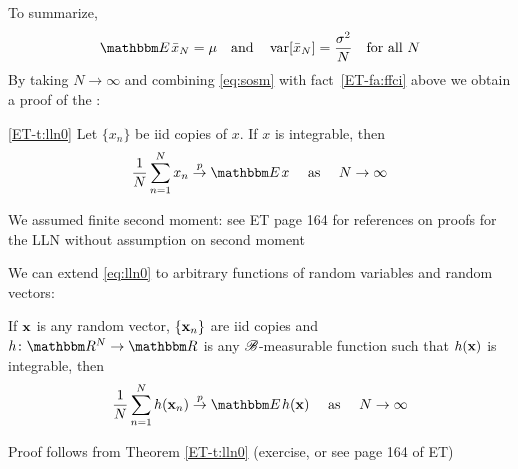 \begin{frame}

    \vspace{2em}
    To summarize,
    \begin{equation}
        \label{eq:sosm}
        \EE \bar x_N = \mu 
        \quad \text{and} \quad
        \var[ \bar x_N ] = \frac{\sigma^2}{N}
        \quad \text{for all } N
    \end{equation}
    By taking $N \to
    \infty$ and combining \eqref{eq:sosm} with fact~\ref{ET-fa:ffci} above we obtain a proof of 
    the :

    \vspace{1em}
    \Thm
        \eqref{ET-t:lln0}
        Let $\{x_n\}$ be {\sc iid} copies of $x$.  If $x$ is integrable, then
        \begin{equation}
            \label{eq:lln0}
            \frac{1}{N} \sum_{n=1}^N x_n \toprob \EE x 
             \quad \text{ as } \quad N \to \infty
        \end{equation}
    
    
    We assumed finite second moment: see ET page 164 for references on proofs for the LLN without assumption on second moment

\end{frame}

\begin{frame}

    \vspace{2em}
    We can extend \eqref{eq:lln0} to 
    arbitrary functions of random variables and random vectors:
    
    \vspace{1em}
    If
    ${\mathbf x}$ is any random vector, $\{{\mathbf x}_n\}$ are {\sc iid} copies and
    $h \colon \RR^N \to \RR$ is any $\mathscr B$-measurable function such that
    $h({\mathbf x})$ is integrable, then
    \begin{equation*}
        \label{eq:lln0g}
        \frac{1}{N} \sum_{n=1}^N h(\boldx_n) \toprob \EE  h(\boldx) 
             \quad \text{ as } \quad N \to \infty
    \end{equation*}
    
    Proof follows from Theorem \eqref{ET-t:lln0} (exercise, or see page 164 of ET)
    
\end{frame}

